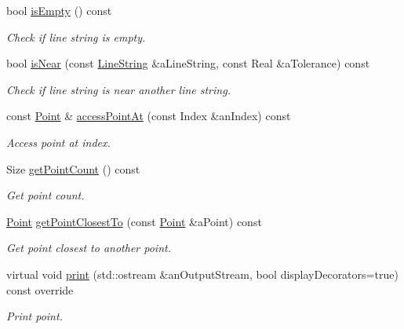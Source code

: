 \begin{DoxyCompactItemize}
bool \hyperlink{classostk_1_1math_1_1geom_1_1d3_1_1objects_1_1_line_string_a9d80b820c5d81d7f68c831c593f665a1}{is\+Empty} () const
\begin{DoxyCompactList}\small\item\em Check if line string is empty. \end{DoxyCompactList}\item 
bool \hyperlink{classostk_1_1math_1_1geom_1_1d3_1_1objects_1_1_line_string_a6947cb8217dcb49d2e0698c83226a1cc}{is\+Near} (const \hyperlink{classostk_1_1math_1_1geom_1_1d3_1_1objects_1_1_line_string}{Line\+String} \&a\+Line\+String, const Real \&a\+Tolerance) const
\begin{DoxyCompactList}\small\item\em Check if line string is near another line string. \end{DoxyCompactList}\item 
const \hyperlink{classostk_1_1math_1_1geom_1_1d3_1_1objects_1_1_point}{Point} \& \hyperlink{classostk_1_1math_1_1geom_1_1d3_1_1objects_1_1_line_string_acdad3606a8b71356a759420d6d56f258}{access\+Point\+At} (const Index \&an\+Index) const
\begin{DoxyCompactList}\small\item\em Access point at index. \end{DoxyCompactList}\item 
Size \hyperlink{classostk_1_1math_1_1geom_1_1d3_1_1objects_1_1_line_string_a40825c96d14212e6d9d04d9b18f82024}{get\+Point\+Count} () const
\begin{DoxyCompactList}\small\item\em Get point count. \end{DoxyCompactList}\item 
\hyperlink{classostk_1_1math_1_1geom_1_1d3_1_1objects_1_1_point}{Point} \hyperlink{classostk_1_1math_1_1geom_1_1d3_1_1objects_1_1_line_string_ac68fc844aa3b7a55673377b0b68571ae}{get\+Point\+Closest\+To} (const \hyperlink{classostk_1_1math_1_1geom_1_1d3_1_1objects_1_1_point}{Point} \&a\+Point) const
\begin{DoxyCompactList}\small\item\em Get point closest to another point. \end{DoxyCompactList}\item 
virtual void \hyperlink{classostk_1_1math_1_1geom_1_1d3_1_1objects_1_1_line_string_a19544146cc4dc2138458c4a228e68d21}{print} (std\+::ostream \&an\+Output\+Stream, bool display\+Decorators=true) const override
\begin{DoxyCompactList}\small\item\em Print point. \end{DoxyCompactList}\item 

\end{DoxyCompactItemize}
